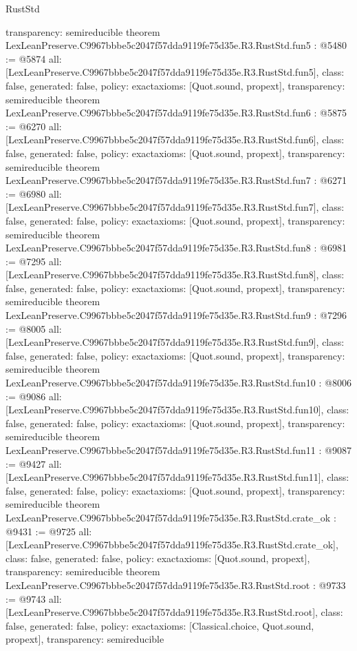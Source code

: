 \begin{lexlean}{RustStd}
\begin{coremodule}
{  transparency: semireducible
}
theorem LexLeanPreserve.C9967bbbe5c2047f57dda9119fe75d35e.R3.RustStd.fun5 : @5480 := @5874 {
  all: [LexLeanPreserve.C9967bbbe5c2047f57dda9119fe75d35e.R3.RustStd.fun5],
  class: false,
  generated: false,
  policy: exact{axioms: [Quot.sound, propext]},
  transparency: semireducible
}
theorem LexLeanPreserve.C9967bbbe5c2047f57dda9119fe75d35e.R3.RustStd.fun6 : @5875 := @6270 {
  all: [LexLeanPreserve.C9967bbbe5c2047f57dda9119fe75d35e.R3.RustStd.fun6],
  class: false,
  generated: false,
  policy: exact{axioms: [Quot.sound, propext]},
  transparency: semireducible
}
theorem LexLeanPreserve.C9967bbbe5c2047f57dda9119fe75d35e.R3.RustStd.fun7 : @6271 := @6980 {
  all: [LexLeanPreserve.C9967bbbe5c2047f57dda9119fe75d35e.R3.RustStd.fun7],
  class: false,
  generated: false,
  policy: exact{axioms: [Quot.sound, propext]},
  transparency: semireducible
}
theorem LexLeanPreserve.C9967bbbe5c2047f57dda9119fe75d35e.R3.RustStd.fun8 : @6981 := @7295 {
  all: [LexLeanPreserve.C9967bbbe5c2047f57dda9119fe75d35e.R3.RustStd.fun8],
  class: false,
  generated: false,
  policy: exact{axioms: [Quot.sound, propext]},
  transparency: semireducible
}
theorem LexLeanPreserve.C9967bbbe5c2047f57dda9119fe75d35e.R3.RustStd.fun9 : @7296 := @8005 {
  all: [LexLeanPreserve.C9967bbbe5c2047f57dda9119fe75d35e.R3.RustStd.fun9],
  class: false,
  generated: false,
  policy: exact{axioms: [Quot.sound, propext]},
  transparency: semireducible
}
theorem LexLeanPreserve.C9967bbbe5c2047f57dda9119fe75d35e.R3.RustStd.fun10 : @8006 := @9086 {
  all: [LexLeanPreserve.C9967bbbe5c2047f57dda9119fe75d35e.R3.RustStd.fun10],
  class: false,
  generated: false,
  policy: exact{axioms: [Quot.sound, propext]},
  transparency: semireducible
}
theorem LexLeanPreserve.C9967bbbe5c2047f57dda9119fe75d35e.R3.RustStd.fun11 : @9087 := @9427 {
  all: [LexLeanPreserve.C9967bbbe5c2047f57dda9119fe75d35e.R3.RustStd.fun11],
  class: false,
  generated: false,
  policy: exact{axioms: [Quot.sound, propext]},
  transparency: semireducible
}
theorem LexLeanPreserve.C9967bbbe5c2047f57dda9119fe75d35e.R3.RustStd.crate_ok : @9431 := @9725 {
  all: [LexLeanPreserve.C9967bbbe5c2047f57dda9119fe75d35e.R3.RustStd.crate_ok],
  class: false,
  generated: false,
  policy: exact{axioms: [Quot.sound, propext]},
  transparency: semireducible
}
theorem LexLeanPreserve.C9967bbbe5c2047f57dda9119fe75d35e.R3.RustStd.root : @9733 := @9743 {
  all: [LexLeanPreserve.C9967bbbe5c2047f57dda9119fe75d35e.R3.RustStd.root],
  class: false,
  generated: false,
  policy: exact{axioms: [Classical.choice, Quot.sound, propext]},
  transparency: semireducible
}


\end{coremodule}
\end{lexlean}
